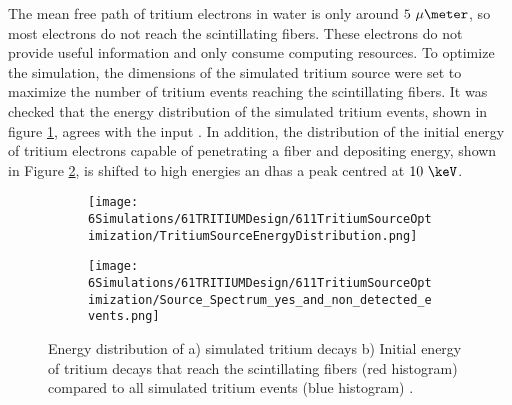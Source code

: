 The mean free path of tritium electrons in water is only around $5~\mu\meter$, so most electrons do not reach the scintillating fibers. These electrons do not provide useful information and only consume computing resources. To optimize the simulation, the dimensions of the simulated tritium source were set to maximize the number of tritium events reaching the scintillating fibers. It was checked that the energy distribution of the simulated tritium events, shown in figure \ref{subfig:EnergyDistributionTritiumSource}, agrees with the input \cite{TritiumEmissionSpectrum}. In addition, the distribution of the initial energy of tritium electrons capable of penetrating a fiber and depositing energy, shown in Figure \ref{subfig:EnergySpectrumEventsDetectedandNonDetected}, is shifted to high energies an dhas a peak centred at $10~\keV$. 

\begin{figure}
\centering
    \begin{subfigure}[b]{0.45\textwidth}
    \centering
    \texttt{[image: 6Simulations/61TRITIUMDesign/611TritiumSourceOptimization/TritiumSourceEnergyDistribution.png]}  
    \caption{\label{subfig:EnergyDistributionTritiumSource}}
    \end{subfigure}
    \hfill
    \begin{subfigure}[b]{0.45\textwidth}
    \centering
    \texttt{[image: 6Simulations/61TRITIUMDesign/611TritiumSourceOptimization/Source\_Spectrum\_yes\_and\_non\_detected\_events.png]}  
    \caption{\label{subfig:EnergySpectrumEventsDetectedandNonDetected}}
    \end{subfigure}
 \caption{Energy distribution of a) simulated tritium decays b) Initial energy of tritium decays that reach the scintillating fibers (red histogram) compared to all simulated tritium events (blue histogram) \cite{SimulationPaperCarlos}.
 \label{fig:TritiumSourceOptimization}}
\end{figure}


